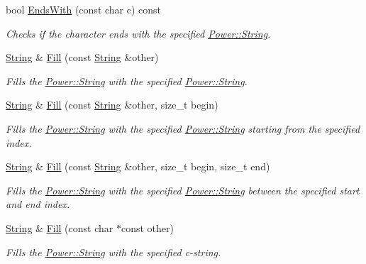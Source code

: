\begin{DoxyCompactItemize}
bool \hyperlink{class_power_1_1_string_a8f4b32bad7099116f14259d2bd0c4004}{Ends\+With} (const char c) const
\begin{DoxyCompactList}\small\item\em Checks if the character ends with the specified \hyperlink{class_power_1_1_string}{Power\+::\+String}. \end{DoxyCompactList}\item 
\hyperlink{class_power_1_1_string}{String} \& \hyperlink{class_power_1_1_string_afcc55f4fa85bbde268d180fd3c515dac}{Fill} (const \hyperlink{class_power_1_1_string}{String} \&other)
\begin{DoxyCompactList}\small\item\em Fills the \hyperlink{class_power_1_1_string}{Power\+::\+String} with the specified \hyperlink{class_power_1_1_string}{Power\+::\+String}. \end{DoxyCompactList}\item 
\hyperlink{class_power_1_1_string}{String} \& \hyperlink{class_power_1_1_string_a9f82a188fdb2c48185075dd778a1a048}{Fill} (const \hyperlink{class_power_1_1_string}{String} \&other, size\+\_\+t begin)
\begin{DoxyCompactList}\small\item\em Fills the \hyperlink{class_power_1_1_string}{Power\+::\+String} with the specified \hyperlink{class_power_1_1_string}{Power\+::\+String} starting from the specified index. \end{DoxyCompactList}\item 
\hyperlink{class_power_1_1_string}{String} \& \hyperlink{class_power_1_1_string_a5baac2af41bfe9f62f856bc2edc887f9}{Fill} (const \hyperlink{class_power_1_1_string}{String} \&other, size\+\_\+t begin, size\+\_\+t end)
\begin{DoxyCompactList}\small\item\em Fills the \hyperlink{class_power_1_1_string}{Power\+::\+String} with the specified \hyperlink{class_power_1_1_string}{Power\+::\+String} between the specified start and end index. \end{DoxyCompactList}\item 
\hyperlink{class_power_1_1_string}{String} \& \hyperlink{class_power_1_1_string_a8adb368321b42b3399836b4f1b6410e2}{Fill} (const char $\ast$const other)
\begin{DoxyCompactList}\small\item\em Fills the \hyperlink{class_power_1_1_string}{Power\+::\+String} with the specified c-\/string. \end{DoxyCompactList}\item 

\end{DoxyCompactItemize}
